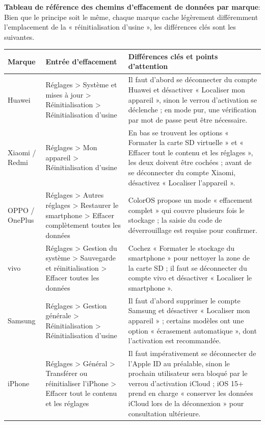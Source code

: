\textbf{Tableau de référence des chemins d'effacement de données par marque}: Bien que le principe soit le même, chaque marque cache légèrement différemment l'emplacement de la « réinitialisation d'usine », les différences clés sont les suivantes.

\begin{center}
\begin{tabularx}{\linewidth}{|X|X|X|}
\hline
\textbf{Marque} & \textbf{Entrée d'effacement} & \textbf{Différences clés et points d'attention} \tabularnewline
\hline
Huawei & Réglages > Système et mises à jour > Réinitialisation > Réinitialisation d'usine & Il faut d'abord se déconnecter du compte Huawei et désactiver « Localiser mon appareil », sinon le verrou d'activation se déclenche ; en mode pur, une vérification par mot de passe peut être nécessaire. \tabularnewline
Xiaomi / Redmi & Réglages > Mon appareil > Réinitialisation d'usine & En bas se trouvent les options « Formater la carte SD virtuelle » et « Effacer tout le contenu et les réglages », les deux doivent être cochées ; avant de se déconnecter du compte Xiaomi, désactivez « Localiser l'appareil ». \tabularnewline
OPPO / OnePlus & Réglages > Autres réglages > Restaurer le smartphone > Effacer complètement toutes les données & ColorOS propose un mode « effacement complet » qui couvre plusieurs fois le stockage ; la saisie du code de déverrouillage est requise pour confirmer. \tabularnewline
vivo & Réglages > Gestion du système > Sauvegarde et réinitialisation > Effacer toutes les données & Cochez « Formater le stockage du smartphone » pour nettoyer la zone de la carte SD ; il faut se déconnecter du compte vivo et désactiver « Localiser le smartphone ». \tabularnewline
Samsung & Réglages > Gestion générale > Réinitialisation > Réinitialisation d'usine & Il faut d'abord supprimer le compte Samsung et désactiver « Localiser mon appareil » ; certains modèles ont une option « écrasement automatique », dont l'activation est recommandée. \tabularnewline
iPhone & Réglages > Général > Transférer ou réinitialiser l'iPhone > Effacer tout le contenu et les réglages & Il faut impérativement se déconnecter de l'Apple ID au préalable, sinon le prochain utilisateur sera bloqué par le verrou d'activation iCloud ; iOS 15+ prend en charge « conserver les données iCloud lors de la déconnexion » pour consultation ultérieure. \tabularnewline
\hline
\end{tabularx}
\end{center}

